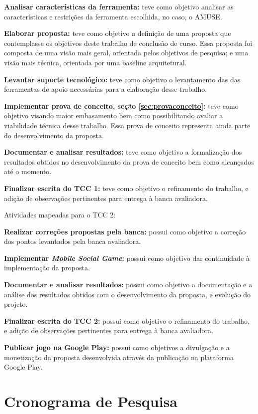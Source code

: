 \textbf{Analisar características da ferramenta:} teve como objetivo analisar as
características e restrições da ferramenta escolhida, no caso, o AMUSE.

\textbf{Elaborar proposta:} teve como objetivo a definição de uma proposta que
contemplasse os objetivos deste trabalho de conclusão de curso. Essa proposta
foi composta de uma visão mais geral, orientada pelos objetivos de pesquisa; e
uma visão mais técnica, orientada por uma baseline arquitetural.

\textbf{Levantar suporte tecnológico:} teve como objetivo o levantamento das
das ferramentas de apoio necessárias para a elaboração desse trabalho.

\textbf{Implementar prova de conceito, seção \ref{sec:provaconceito}:} teve
como objetivo visando maior embasamento bem como possibilitando avaliar a
viabilidade técnica desse trabalho. Essa prova de conceito representa ainda
parte do desenvolvimento da proposta.

\textbf{Documentar e analisar resultados:} teve como objetivo a formalização dos
resultados obtidos no desenvolvimento da prova de conceito bem como alcançados
até o momento.

\textbf{Finalizar escrita do TCC 1:} teve como objetivo o refinamento do
trabalho, e adição de observações pertinentes para entrega à banca avaliadora.

Atividades mapeadas para o TCC 2:

\textbf{Realizar correções propostas pela banca:} possui como objetivo a
correção dos pontos levantados pela banca avaliadora.

\textbf{Implementar \textit{Mobile Social Game}:} possui como objetivo dar
continuidade à implementação da proposta.

\textbf{Documentar e analisar resultados:} possui como objetivo a documentação e
a análise dos resultados obtidos com o desenvolvimento da proposta, e evolução
do projeto.

\textbf{Finalizar escrita do TCC 2:} possui como objetivo o refinamento do
trabalho, e adição de observações pertinentes para entrega à banca avaliadora.

\textbf{Publicar jogo na Google Play:} possui como objetivos a divulgação e a
monetização da proposta desenvolvida através da publicação na plataforma Google
Play.


\section{Cronograma de Pesquisa}
\label{sec:cronograma}

